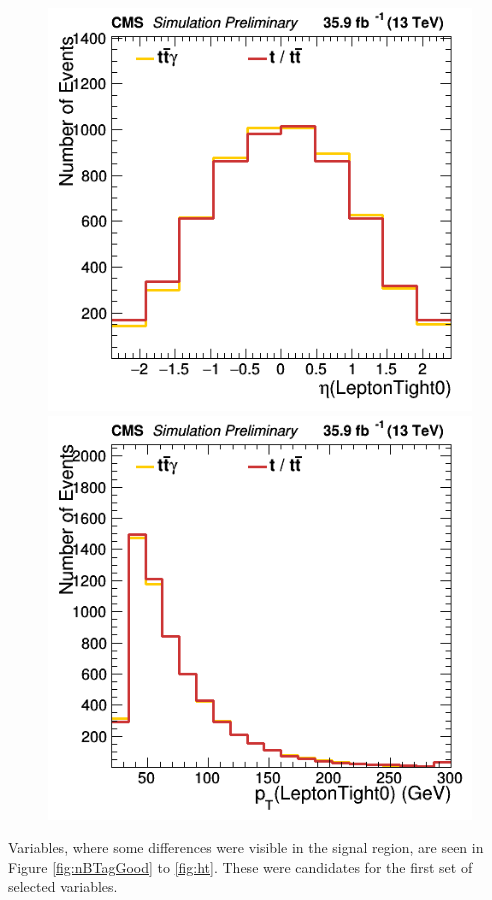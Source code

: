 \documentclass[11pt]{scrartcl}
\begin{document}
\begin{figure}[H]
\centering
\begin{minipage}{.5\textwidth}
  \centering
  \includegraphics[width=0.70\linewidth]{figures/Notused/LeptonTight0_eta.png}
\end{minipage}%
\begin{minipage}{.5\textwidth}
  \centering
  \includegraphics[width=0.70\linewidth]{figures/Notused/LeptonTight0_pt.png}
\end{minipage}
\label{fig:LeptonTight0eta}
\end{figure}

Variables, where some differences were visible in the signal region, are seen in Figure \ref{fig:nBTagGood} to \ref{fig:ht}. These were candidates for the first set of selected variables. 
\end{document}
